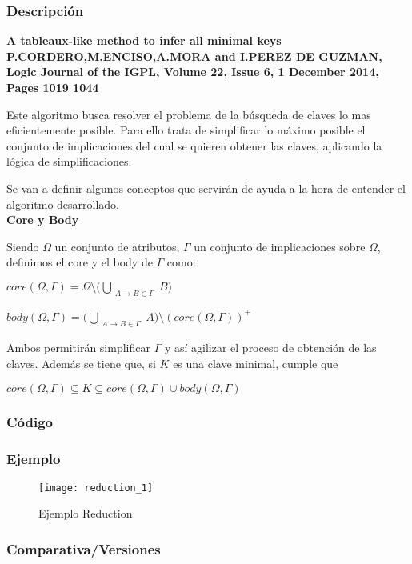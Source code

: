\subsubsection{Descripci\'on} 
\textbf{A tableaux-like method to infer all minimal keys
P.CORDERO,M.ENCISO,A.MORA and I.PEREZ DE GUZMAN,
Logic Journal of the IGPL, Volume 22, Issue 6, 1 December 2014, Pages 1019 1044}

\cite{Reduction}
Este algoritmo busca resolver el problema de la b\'usqueda de claves lo mas eficientemente posible. Para ello trata de simplificar lo m\'aximo posible el conjunto de implicaciones del cual se quieren obtener las claves, aplicando la l\'ogica de simplificaciones.

Se van a definir algunos conceptos que servir\'an de ayuda a la hora de entender el algoritmo desarrollado.\\

\textbf{Core y Body}

Siendo \(\Omega\) un conjunto de atributos, \(\Gamma\) un conjunto de implicaciones sobre \(\Omega\), definimos el core y el body de \(\Gamma\) como:
\begin{center}
    \(core(\Omega,\Gamma) = \Omega \setminus \big(\bigcup_{\substack{A \to B \in \Gamma}} B\big)\)

    \(body(\Omega,\Gamma) = \big(\bigcup_{\substack{A \to B \in \Gamma}} A\big) \setminus (core(\Omega,\Gamma))^+\)
\end{center}
Ambos permitir\'an simplificar \(\Gamma\) y as\'i agilizar el proceso de obtenci\'on de las claves. Adem\'as se tiene que, si \(K\) es una clave minimal, cumple que 
\begin{center}
    \(core(\Omega,\Gamma) \subseteq K \subseteq core(\Omega,\Gamma) \cup body(\Omega,\Gamma)\)
\end{center}
\newpage
\subsubsection{C\'odigo} 

\newpage
\subsubsection{Ejemplo} 
\begin{figure}[H]
    \centering
    \texttt{[image: reduction\_1]}
    \caption{Ejemplo Reduction}
    \label{fig:reduction_1}
\end{figure}
\subsubsection{Comparativa/Versiones} 